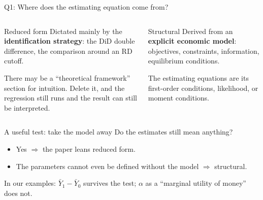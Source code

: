 \documentclass[aspectratio=169,11pt]{beamer}
\begin{document}
\begin{frame}{Q1: Where does the estimating equation come from?}

\begin{columns}[T]

\begin{block}{Reduced form}
Dictated mainly by the \textbf{identification strategy}:
the DiD double difference, the comparison around an RD cutoff.

\vspace{0.2em}

There may be a ``theoretical framework'' section for intuition.
Delete it, and the regression still runs and the result can still
be interpreted.
\end{block}

\begin{block}{Structural}
Derived from an \textbf{explicit economic model}:
objectives, constraints, information, equilibrium conditions.

\vspace{0.2em}

The estimating equations are its first-order conditions,
likelihood, or moment conditions.
\end{block}

\end{columns}

\vspace{0.5em}

\begin{alertblock}{A useful test: take the model away}
Do the estimates still mean anything?
\begin{itemize}
    \item Yes $\Rightarrow$ the paper leans reduced form.
    \item The parameters cannot even be defined without the model
    $\Rightarrow$ structural.
\end{itemize}
\end{alertblock}

In our examples: $\bar Y_1-\bar Y_0$ survives the test;
$\alpha$ as a ``marginal utility of money'' does not.

\end{frame}
\end{document}
